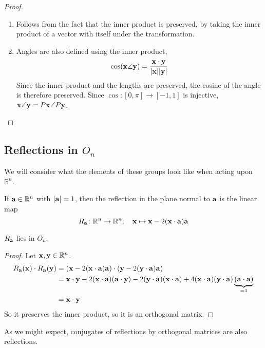 \begin{proof}
	\begin{enumerate}
		\item Follows from the fact that the inner product is preserved, by taking the inner product of a vector with itself under the transformation.
		\item Angles are also defined using the inner product,
			  \[
				  \cos (\vb x \angle \vb y) = \frac{\vb x \cdot \vb y}{\abs{\vb x}\abs{\vb y}}
			  \]
			  Since the inner product and the lengths are preserved, the cosine of the angle is therefore preserved.
			  Since \(\cos\colon [0, \pi] \to [-1, 1]\) is injective, \(\vb x \angle \vb y = P\vb x \angle P\vb y\).
	\end{enumerate}
\end{proof}

\subsection{Reflections in \(O_n\)}
We will consider what the elements of these groups look like when acting upon \(\mathbb R^n\).
\begin{definition}
	If \(\vb a \in \mathbb R^n\) with \(\abs{\vb a} = 1\), then the reflection in the plane normal to \(\vb a\) is the linear map
	\[
		R_{\vb a} \colon \mathbb R^n \to \mathbb R^n;\quad \vb x \mapsto \vb x - 2 (\vb x \cdot \vb a) \vb a
	\]
\end{definition}
\begin{lemma}
	\(R_{\vb a}\) lies in \(O_n\).
\end{lemma}
\begin{proof}
	Let \(\vb x, \vb y \in \mathbb R^n\).
	\begin{align*}
		R_{\vb a}(\vb x) \cdot R_{\vb a}(\vb y) & = (\vb x - 2 (\vb x \cdot \vb a) \vb a) \cdot (\vb y - 2 (\vb y \cdot \vb a) \vb a)                                                                                                  \\
		                                        & = \vb x \cdot \vb y - 2(\vb x \cdot \vb a)(\vb a \cdot \vb y) - 2(\vb y\cdot \vb a)(\vb x \cdot \vb a) + 4(\vb x\cdot \vb a)(\vb y \cdot \vb a)\underbrace{(\vb a \cdot \vb a)}_{=1} \\
		                                        & = \vb x \cdot \vb y
	\end{align*}
	So it preserves the inner product, so it is an orthogonal matrix.
\end{proof}
As we might expect, conjugates of reflections by orthogonal matrices are also reflections.
